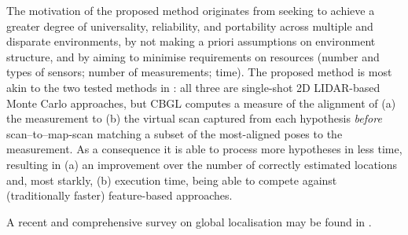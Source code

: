 The motivation of the proposed method originates from seeking to achieve a
greater degree of universality, reliability, and portability across multiple
and disparate environments, by not making a priori assumptions on environment
structure, and by aiming to minimise requirements on resources (number and
types of sensors; number of measurements; time). The proposed method is most
akin to the two tested methods in \cite{Filotheou2022g}: all three are
single-shot 2D LIDAR-based Monte Carlo approaches, but CBGL computes a measure
of the alignment of (a) the measurement to (b) the virtual scan captured from
each hypothesis \textit{before} scan--to--map-scan matching a subset of the
most-aligned poses to the measurement. As a consequence it is able to process
more hypotheses in less time, resulting in (a) an improvement over the number
of correctly estimated locations and, most starkly, (b) execution time, being
able to compete against (traditionally faster) feature-based approaches.

A recent and comprehensive survey on global localisation may be found in
\cite{gl_survey_cn}.
